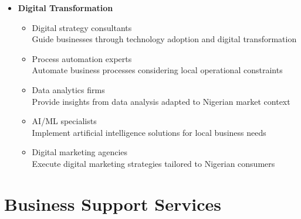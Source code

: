 \begin{tcolorbox}[
    colback=white,
    colframe=primarydark,
    title=\textbf{Technology Service Providers},
    before skip=1em,
    after skip=1em
]
\begin{itemize}[leftmargin=*,itemsep=0.5em]
        \vspace{0.5em}

        \item \textbf{Digital Transformation}
        \begin{itemize}[itemsep=0.3em]
            \item Digital strategy consultants \\
                \small{Guide businesses through technology adoption and digital transformation}
            \item Process automation experts \\
                \small{Automate business processes considering local operational constraints}
            \item Data analytics firms \\
                \small{Provide insights from data analysis adapted to Nigerian market context}
            \item AI/ML specialists \\
                \small{Implement artificial intelligence solutions for local business needs}
            \item Digital marketing agencies \\
                \small{Execute digital marketing strategies tailored to Nigerian consumers}
        \end{itemize}
    \end{itemize}
\end{tcolorbox}

\section{Business Support Services}\label{sec:business-support}
\vspace{1em}

